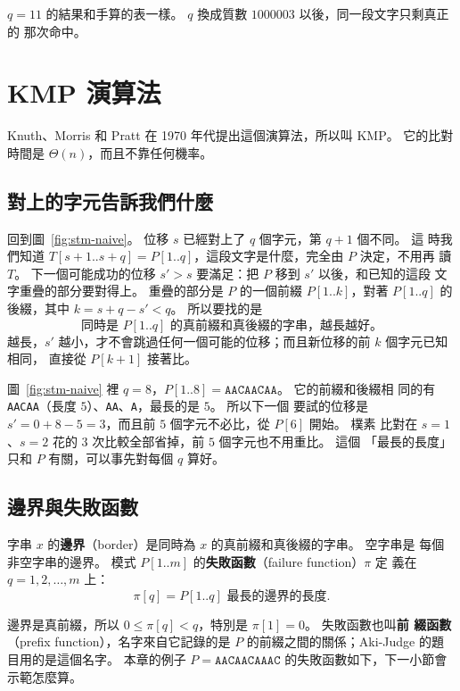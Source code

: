 $q = 11$ 的結果和手算的表一樣。 $q$ 換成質數 $1000003$ 以後，同一段文字只剩真正的
那次命中。

\section{KMP 演算法}
\label{sec:stm-kmp}

Knuth、Morris 和 Pratt 在 1970 年代提出這個演算法，所以叫 KMP。 它的比對時間是
$\Theta(n)$，而且不靠任何機率。

\subsection{對上的字元告訴我們什麼}

回到圖~\ref{fig:stm-naive}。 位移 $s$ 已經對上了 $q$ 個字元，第 $q + 1$ 個不同。 這
時我們知道 $T[s + 1 .. s + q] = P[1..q]$，這段文字是什麼，完全由 $P$ 決定，不用再
讀 $T$。 下一個可能成功的位移 $s' > s$ 要滿足：把 $P$ 移到 $s'$ 以後，和已知的這段
文字重疊的部分要對得上。 重疊的部分是 $P$ 的一個前綴 $P[1..k]$，對著
$P[1..q]$ 的後綴，其中 $k = s + q - s' < q$。 所以要找的是
\[
\text{同時是 } P[1..q] \text{ 的真前綴和真後綴的字串，越長越好。}
\]
越長，$s'$ 越小，才不會跳過任何一個可能的位移；而且新位移的前 $k$ 個字元已知相同，
直接從 $P[k + 1]$ 接著比。

圖~\ref{fig:stm-naive} 裡 $q = 8$，$P[1..8] = \mathtt{AACAACAA}$。 它的前綴和後綴相
同的有 \texttt{AACAA}（長度 $5$）、\texttt{AA}、\texttt{A}，最長的是 $5$。 所以下一個
要試的位移是 $s' = 0 + 8 - 5 = 3$，而且前 $5$ 個字元不必比，從 $P[6]$ 開始。 樸素
比對在 $s = 1$、$s = 2$ 花的 $3$ 次比較全部省掉，前 $5$ 個字元也不用重比。 這個
「最長的長度」只和 $P$ 有關，可以事先對每個 $q$ 算好。

\subsection{邊界與失敗函數}

\begin{definition}
\label{def:stm-border}
字串 $x$ 的\textbf{邊界}（border）是同時為 $x$ 的真前綴和真後綴的字串。 空字串是
每個非空字串的邊界。 模式 $P[1..m]$ 的\textbf{失敗函數}（failure function）$\pi$ 定
義在 $q = 1, 2, \ldots, m$ 上：
\[
\pi[q] = P[1..q] \text{ 最長的邊界的長度}.
\]
\end{definition}

邊界是真前綴，所以 $0 \le \pi[q] < q$，特別是 $\pi[1] = 0$。 失敗函數也叫\textbf{前
綴函數}（prefix function），名字來自它記錄的是 $P$ 的前綴之間的關係；Aki-Judge 的題
目用的是這個名字。 本章的例子 $P = \mathtt{AACAACAAAC}$ 的失敗函數如下，下一小節會
示範怎麼算。

